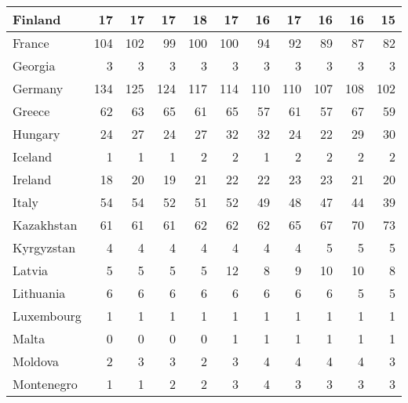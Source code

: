 \begin{table}
\begin{tabular}{|l|r|r|r|r|r|r|r|r|r|r|}
                       Finland&     17&     17&     17&     18&     17&     16&     17&     16&     16&     15\\\hline
                        France&    104&    102&     99&    100&    100&     94&     92&     89&     87&     82\\\hline
                       Georgia&      3&      3&      3&      3&      3&      3&      3&      3&      3&      3\\\hline
                       Germany&    134&    125&    124&    117&    114&    110&    110&    107&    108&    102\\\hline
                        Greece&     62&     63&     65&     61&     65&     57&     61&     57&     67&     59\\\hline
                       Hungary&     24&     27&     24&     27&     32&     32&     24&     22&     29&     30\\\hline
                       Iceland&      1&      1&      1&      2&      2&      1&      2&      2&      2&      2\\\hline
                       Ireland&     18&     20&     19&     21&     22&     22&     23&     23&     21&     20\\\hline
                         Italy&     54&     54&     52&     51&     52&     49&     48&     47&     44&     39\\\hline
                    Kazakhstan&     61&     61&     61&     62&     62&     62&     65&     67&     70&     73\\\hline
                    Kyrgyzstan&      4&      4&      4&      4&      4&      4&      4&      5&      5&      5\\\hline
                        Latvia&      5&      5&      5&      5&     12&      8&      9&     10&     10&      8\\\hline
                     Lithuania&      6&      6&      6&      6&      6&      6&      6&      6&      5&      5\\\hline
                    Luxembourg&      1&      1&      1&      1&      1&      1&      1&      1&      1&      1\\\hline
                         Malta&      0&      0&      0&      0&      1&      1&      1&      1&      1&      1\\\hline
                       Moldova&      2&      3&      3&      2&      3&      4&      4&      4&      4&      3\\\hline
                    Montenegro&      1&      1&      2&      2&      3&      4&      3&      3&      3&      3\\\hline

\end{tabular}
\end{table}
